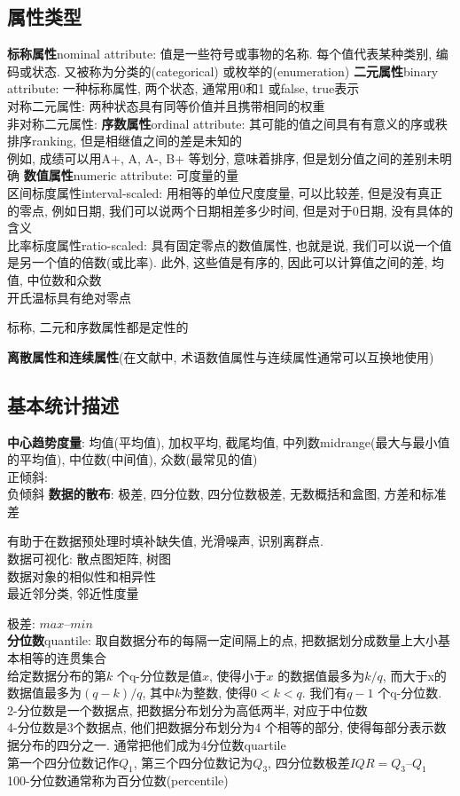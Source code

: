 \documentclass{article}
\begin{document}
\subsection{属性类型}
\textbf{标称属性}nominal attribute: 值是一些符号或事物的名称. 每个值代表某种类别, 编码或状态. 又被称为分类的(categorical) 或枚举的(enumeration)
\textbf{二元属性}binary attribute: 一种标称属性, 两个状态, 通常用0和1 或false, true表示\\
对称二元属性: 两种状态具有同等价值并且携带相同的权重\\
非对称二元属性:
\textbf{序数属性}ordinal attribute: 其可能的值之间具有有意义的序或秩排序ranking, 但是相继值之间的差是未知的\\
例如, 成绩可以用A+, A, A-, B+ 等划分, 意味着排序, 但是划分值之间的差别未明确
\textbf{数值属性}numeric attribute: 可度量的量\\
	区间标度属性interval-scaled: 用相等的单位尺度度量, 可以比较差, 但是没有真正的零点, 例如日期, 我们可以说两个日期相差多少时间, 但是对于0日期, 没有具体的含义\\
	比率标度属性ratio-scaled: 具有固定零点的数值属性, 也就是说, 我们可以说一个值是另一个值的倍数(或比率). 此外, 这些值是有序的, 因此可以计算值之间的差, 均值, 中位数和众数\\
	开氏温标具有绝对零点\par
标称, 二元和序数属性都是定性的

\textbf{离散属性和连续属性}(在文献中, 术语数值属性与连续属性通常可以互换地使用)

\subsection{基本统计描述}
\textbf{中心趋势度量}: 均值(平均值), 加权平均, 截尾均值, 中列数midrange(最大与最小值的平均值), 中位数(中间值), 众数(最常见的值)\\
	正倾斜:\\
	负倾斜
\textbf{数据的散布}: 极差, 四分位数, 四分位数极差, 无数概括和盒图, 方差和标准差

有助于在数据预处理时填补缺失值, 光滑噪声, 识别离群点.\\
数据可视化: 散点图矩阵, 树图\\
数据对象的相似性和相异性\\
最近邻分类, 邻近性度量

极差: $max – min$ \\
\textbf{分位数}quantile: 取自数据分布的每隔一定间隔上的点, 把数据划分成数量上大小基本相等的连贯集合\\
给定数据分布的第$k$ 个q-分位数是值$x$, 使得小于$x$ 的数据值最多为$k/q$, 而大于x的数据值最多为$(q-k)/q$, 其中$k$为整数, 使得$0<k<q$. 我们有$q-1$ 个q-分位数.
2-分位数是一个数据点, 把数据分布划分为高低两半, 对应于中位数\\
4-分位数是3个数据点, 他们把数据分布划分为4 个相等的部分, 使得每部分表示数据分布的四分之一. 通常把他们成为4分位数quartile\\
第一个四分位数记作$Q_1$, 第三个四分位数记为$Q_3$, 四分位数极差$IQR = Q_3 – Q_1$\\
100-分位数通常称为百分位数(percentile)
\end{document}

